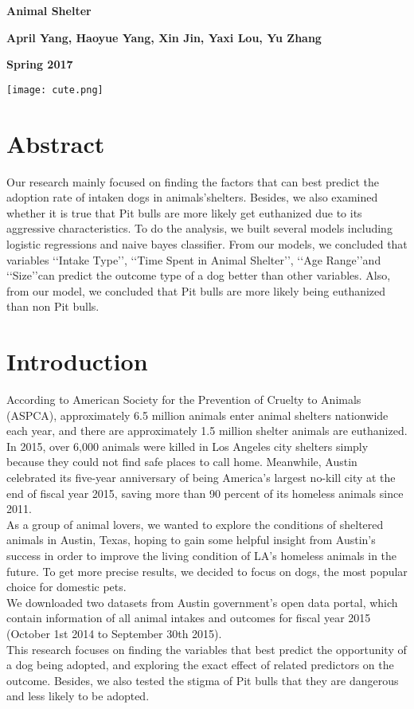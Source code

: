 \documentclass[12pt]{article}
\begin{document}
\begin{flushleft}
\centerline{\Huge\textbf{ Animal Shelter }}
\bigskip
\centerline{\Large\textbf{ April Yang, Haoyue Yang, Xin Jin,  Yaxi Lou, Yu Zhang}}
\centerline{\textbf{Spring 2017}}
\bigskip
\bigskip
\bigskip
\bigskip
\bigskip
\begin{center}
\texttt{[image: cute.png]}
\end{center}
\newpage
\tableofcontents
\newpage
\section{Abstract}
    Our research mainly focused on finding the factors that can best predict the adoption rate of intaken dogs in animals\rq shelters. Besides, we also examined whether it is true that Pit bulls are more likely get euthanized due to its aggressive characteristics. To do the analysis, we built several models including logistic regressions and naive bayes classifier. From our models, we concluded that variables \lq\lq Intake Type\rq\rq, \lq\lq Time Spent in Animal Shelter\rq\rq, \lq\lq Age Range\rq\rq and \lq\lq Size\rq\rq can predict the outcome type of a dog better than other variables. Also, from our model, we concluded that Pit bulls are more likely being euthanized than non Pit bulls.\\
\bigskip
\section{Introduction}
According to American Society for the Prevention of Cruelty to Animals (ASPCA), approximately 6.5 million animals enter animal shelters nationwide each year, and there are approximately 1.5 million shelter animals are euthanized. In 2015, over 6,000 animals were killed in Los Angeles city shelters simply because they could not find safe places to call home. Meanwhile, Austin celebrated its five-year anniversary of being America’s largest no-kill city at the end of fiscal year 2015, saving more than 90 percent of its homeless animals since 2011. \\
As a group of animal lovers, we wanted to explore the conditions of sheltered animals in Austin, Texas, hoping to gain some helpful insight from Austin's success in order to improve the living condition of LA\rq s homeless animals in the future. To get more precise results, we decided to focus on dogs, the most popular choice for domestic pets.\\
We downloaded two datasets from Austin government’s open data portal, which contain information of all animal intakes and outcomes for fiscal year 2015 (October 1st 2014 to September 30th 2015). \\
This research focuses on finding the variables that best predict the opportunity of a dog being adopted, and exploring the exact effect of related predictors on the outcome. Besides, we also tested the stigma of Pit bulls that they are dangerous and less likely to be adopted.\\
\bigskip

\end{flushleft}
\end{document}
